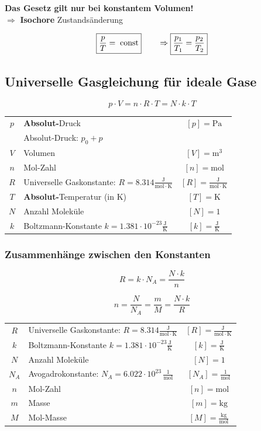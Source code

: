 \textbf{Das Gesetz gilt nur bei konstantem Volumen!} \\
$\Rightarrow$ \textbf{Isochore} Zustandsänderung

$$ \boxed{ \frac{p}{T} = \; \mathrm{const} } \qquad  \Rightarrow \boxed{ \frac{p_1}{T_1} = \frac{p_2}{T_2} }$$


	
\subsection{Universelle Gasgleichung für ideale Gase}\label{Gasgleichung ideal}

$$ \boxed{ p \cdot V = n \cdot R \cdot T = N \cdot k \cdot T }$$
	
	
\begin{tabular}{c l c}
	$p$ & \textbf{Absolut-}Druck & $[p] = \mathrm{Pa}$ \\
	    & Absolut-Druck: $p_0 + p$ & \\
	$V$ & Volumen & $[V] = \mathrm{m^3}$ \\
	$n$ & Mol-Zahl & $[n] = \mathrm{mol}$ \\
	\rule{0pt}{8pt}$R$ & Universelle Gaskonstante: $R = 8.314 \mathrm{\frac{J}{mol \cdot K}}$ & $[R] = \mathrm{\frac{J}{mol \cdot K}} $ \\
	$T$ & \textbf{Absolut-}Temperatur (in K) & $[T] = \mathrm{K}$ \\
	$N$ & Anzahl Moleküle & $[N] = 1$ \\
	\rule{0pt}{8pt}$k$ & Boltzmann-Konstante $k = 1.381 \cdot 10^{-23} \mathrm{\frac{J}{K}}$ & $[k] = \mathrm{\frac{J}{K}}$ \\
\end{tabular}
	
	
	
	
\subsubsection{Zusammenhänge zwischen den Konstanten}
	
$$  \boxed{ R = k \cdot N_A = \frac{N \cdot k}{n} } $$

$$\boxed{ n = \frac{N}{N_A} = \frac{m}{M} = \frac{N \cdot k}{R} } $$
	


\begin{tabular}{c l c}
	\rule{0pt}{8pt}$R$ & Universelle Gaskonstante: $R = 8.314 \mathrm{\frac{J}{mol \cdot K}}$ & $[R] = \mathrm{\frac{J}{mol \cdot K}} $ \\
	\rule{0pt}{8pt}$k$ & Boltzmann-Konstante $k = 1.381 \cdot 10^{-23} \mathrm{\frac{J}{K}}$ & $[k] = \mathrm{\frac{J}{K}}$ \\
	$N$ & Anzahl Moleküle & $[N] = 1$ \\
	\rule{0pt}{8pt}$N_A$ & 	Avogadrokonstante: $N_A = 6.022 \cdot 10^{23} \, \mathrm{\frac{1}{mol}} $ & $[N_A] =  \mathrm{\frac{1}{mol}}$  \\	
	$n$ & Mol-Zahl & $[n] = \mathrm{mol}$ \\
	$m$ & Masse & $[m] = \mathrm{kg}$ \\
	\rule{0pt}{8pt}$M$ & Mol-Masse & $[M] = \mathrm{\frac{kg}{mol}}$ \\
\end{tabular}

